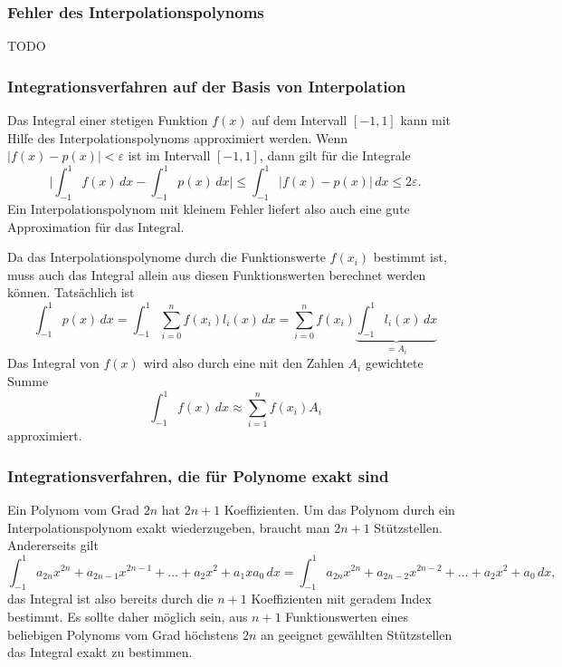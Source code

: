 \subsubsection{Fehler des Interpolationspolynoms}
TODO

\subsubsection{Integrationsverfahren auf der Basis von Interpolation}
Das Integral einer stetigen Funktion $f(x)$ auf dem Intervall $[-1,1]$
kann mit Hilfe des Interpolationspolynoms approximiert werden.
Wenn $|f(x)-p(x)|<\varepsilon$ ist im Intervall $[-1,1]$, dann gilt
für die Integrale
\[
\biggl|\int_{-1}^1 f(x)\,dx -\int_{-1}^1p(x)\,dx\biggr|
\le
\int_{-1}^1 |f(x)-p(x)|\,dx
\le
2\varepsilon.
\]
Ein Interpolationspolynom mit kleinem Fehler liefert also auch
eine gute Approximation für das Integral.

Da das Interpolationspolynome durch die Funktionswerte $f(x_i)$
bestimmt ist, muss auch das Integral allein aus diesen Funktionswerten
berechnet werden können.
Tatsächlich ist
\[
\int_{-1}^1 p(x)\,dx
=
\int_{-1}^1 \sum_{i=0}^n f(x_i)l_i(x)\,dx
=
\sum_{i=0}^n f(x_i)
\underbrace{\int_{-1}^1
l_i(x)\,dx}_{\displaystyle = A_i}
\]
Das Integral von $f(x)$ wird also durch eine mit den Zahlen $A_i$
gewichtete Summe
\[
\int_{-1}^1 f(x)\,dx
\approx
\sum_{i=1}^n f(x_i)A_i
\]
approximiert.

\subsubsection{Integrationsverfahren, die für Polynome exakt sind}
Ein Polynom vom Grad $2n$ hat $2n+1$ Koeffizienten.
Um das Polynom durch ein Interpolationspolynom exakt wiederzugeben,
braucht man $2n+1$ Stützstellen.
Andererseits gilt
\[
\int_{-1}^1 a_{2n}x^{2n} + a_{2n-1}x^{2n-1} + \dots + a_2x^2 + a_1x a_0\,dx
=
\int_{-1}^1 a_{2n}x^{2n} + a_{2n-2}x^{2n-2}+\dots +a_2x^2 +a_0\,dx,
\]
das Integral ist also bereits durch die $n+1$ Koeffizienten mit geradem
Index bestimmt.
Es sollte daher möglich sein, aus $n+1$ Funktionswerten eines beliebigen
Polynoms vom Grad höchstens $2n$ an geeignet gewählten Stützstellen das
Integral exakt zu bestimmen.

